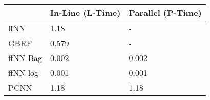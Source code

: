 \begin{tabular}{lll}
\toprule
{} & In-Line (L-Time) & Parallel (P-Time) \\
\midrule
ffNN     &             1.18 &                 - \\
GBRF     &            0.579 &                 - \\
ffNN-Bag &            0.002 &             0.002 \\
ffNN-log &            0.001 &             0.001 \\
PCNN     &             1.18 &              1.18 \\
\bottomrule
\end{tabular}
